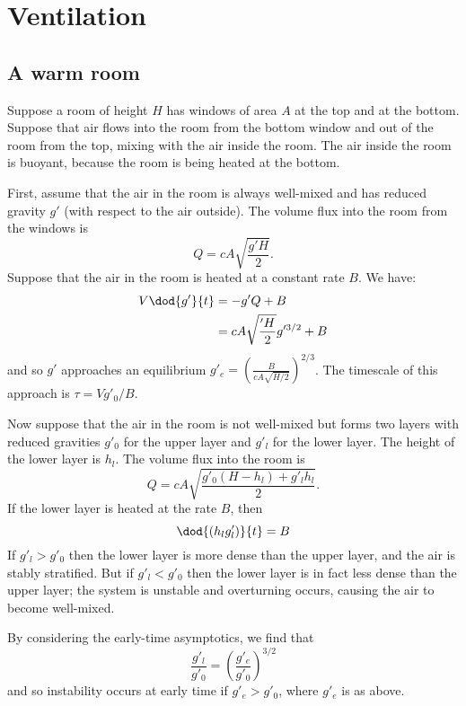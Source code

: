 \section{Ventilation}

\subsection{A warm room}

Suppose a room of height $H$ has windows of area $A$ at the top and at the
bottom. Suppose that air flows into the room from the bottom
window and out of the room from the top, mixing with the air inside the room.
The air inside the room is buoyant, because the room is being heated at the
bottom.

First, assume that the air in the room is always well-mixed and has reduced
gravity $g'$ (with respect to the air outside). The volume flux into the room
from the windows is 
\begin{equation}
    Q = cA \sqrt{\frac{g'H}{2}}.
\end{equation}
Suppose that the air in the room is heated at a constant rate $B$. 
We have:
\begin{align}
    V \dod{g'}{t} &= -g' Q + B \\
                  &= cA \sqrt{\frac{'H}{2}} g'^{3/2} + B \\
\end{align}
and so $g'$ approaches an equilibrium $g'_e = \left( \frac{B}{cA\sqrt{H/2}}
\right)^{2/3} $.
The timescale of this approach is $\tau = V g'_0/B$.

Now suppose that the air in the room is not well-mixed but forms two layers with
reduced gravities $g'_0$ for the upper layer and $g'_l$ for the lower layer. The
height of the lower layer is $h_l$. The volume flux into the room is
\begin{equation}
    Q = cA \sqrt{\frac{ g'_0(H-h_l) + g'_l h_l }{2}}.
\end{equation}
If the lower layer is heated at the rate $B$, then
\begin{equation}
    \dod{(h_l g'_l)}{t} = B
\end{equation}
If $g'_l > g'_0$ then the lower layer is more dense than the upper layer, and
the air is stably stratified. But if $g'_l < g'_0$ then the lower layer is in
fact less dense than the upper layer; the system is unstable and overturning
occurs, causing the air to become well-mixed. 

By considering the early-time asymptotics, we find that
\begin{equation}
    \frac{g'_l}{g'_0} = \left( \frac{g'_e}{g'_0} \right)^{3/2}
\end{equation}
and so instability occurs at early time if $g'_e > g'_0$, where $g'_e$ is as above.

